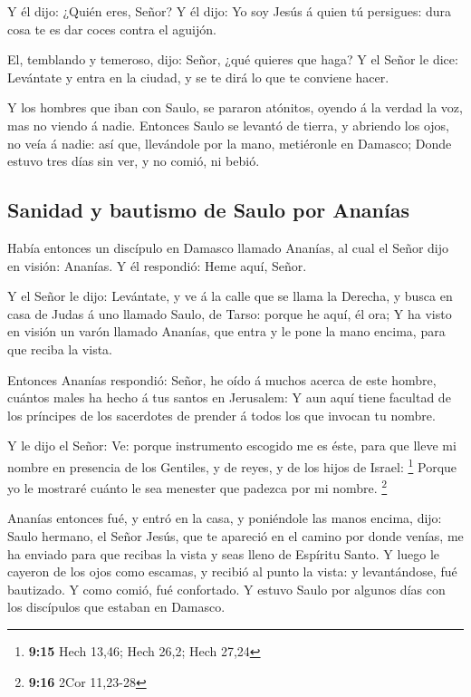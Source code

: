  Y él dijo: ¿Quién eres, Señor? Y él dijo: Yo soy Jesús á
quien tú persigues: dura cosa te es dar coces contra el aguijón.

 El, temblando y temeroso, dijo: Señor, ¿qué quieres que
haga? Y el Señor le dice: Levántate y entra en la ciudad, y se te dirá
lo que te conviene hacer.

 Y los hombres que iban con Saulo, se pararon atónitos,
oyendo á la verdad la voz, mas no viendo á nadie.  Entonces
Saulo se levantó de tierra, y abriendo los ojos, no veía á nadie: así
que, llevándole por la mano, metiéronle en Damasco;  Donde
estuvo tres días sin ver, y no comió, ni bebió.

\hypertarget{sanidad-y-bautismo-de-saulo-por-ananuxedas}{%
\subsection{Sanidad y bautismo de Saulo por
Ananías}\label{sanidad-y-bautismo-de-saulo-por-ananuxedas}}

 Había entonces un discípulo en Damasco llamado Ananías, al
cual el Señor dijo en visión: Ananías. Y él respondió: Heme aquí, Señor.

 Y el Señor le dijo: Levántate, y ve á la calle que se
llama la Derecha, y busca en casa de Judas á uno llamado Saulo, de
Tarso: porque he aquí, él ora;  Y ha visto en visión un
varón llamado Ananías, que entra y le pone la mano encima, para que
reciba la vista.

 Entonces Ananías respondió: Señor, he oído á muchos acerca
de este hombre, cuántos males ha hecho á tus santos en Jerusalem:
 Y aun aquí tiene facultad de los príncipes de los
sacerdotes de prender á todos los que invocan tu nombre.

 Y le dijo el Señor: Ve: porque instrumento escogido me es
éste, para que lleve mi nombre en presencia de los Gentiles, y de reyes,
y de los hijos de Israel: \footnote{\textbf{9:15} Hech 13,46; Hech 26,2;
  Hech 27,24}  Porque yo le mostraré cuánto le sea menester
que padezca por mi nombre. \footnote{\textbf{9:16} 2Cor 11,23-28}

 Ananías entonces fué, y entró en la casa, y poniéndole las
manos encima, dijo: Saulo hermano, el Señor Jesús, que te apareció en el
camino por donde venías, me ha enviado para que recibas la vista y seas
lleno de Espíritu Santo.  Y luego le cayeron de los ojos
como escamas, y recibió al punto la vista: y levantándose, fué
bautizado.  Y como comió, fué confortado. Y estuvo Saulo
por algunos días con los discípulos que estaban en Damasco.

